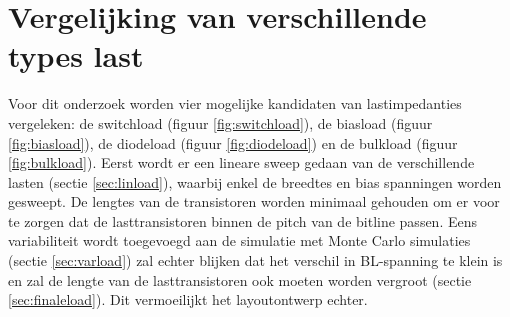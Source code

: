 \section{Vergelijking van verschillende types last}
Voor dit onderzoek worden vier mogelijke kandidaten van lastimpedanties vergeleken: de switchload (figuur \ref{fig:switchload}), de biasload (figuur \ref{fig:biasload}), de diodeload (figuur \ref{fig:diodeload}) en de bulkload (figuur \ref{fig:bulkload})\cite{bulkload}. Eerst wordt er een lineare sweep gedaan van de verschillende lasten (sectie \ref{sec:linload}), waarbij enkel de breedtes en bias spanningen worden gesweept. De lengtes van de transistoren worden minimaal gehouden om er voor te zorgen dat de lasttransistoren binnen de pitch van de bitline passen. Eens variabiliteit wordt toegevoegd aan de simulatie met Monte Carlo simulaties (sectie \ref{sec:varload}) zal echter blijken dat het verschil in BL-spanning te klein is en zal de lengte van de lasttransistoren ook moeten worden vergroot (sectie \ref{sec:finaleload}). Dit vermoeilijkt het layoutontwerp echter.


